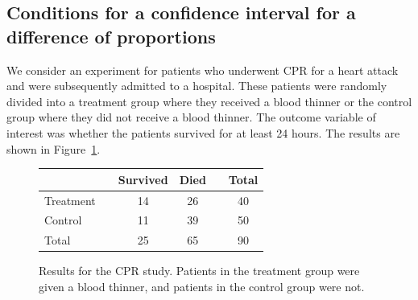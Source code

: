 \D{\newpage}

\subsection{Conditions for a confidence interval for a difference of proportions}

We consider an experiment for patients who underwent CPR for a heart attack and were subsequently admitted to a hospital. These patients were randomly divided into a treatment group where they received a blood thinner or the control group where they did not receive a blood thinner. The outcome variable of interest was whether the patients survived for at least 24 hours.
    The results are shown in  Figure~\ref{resultsForCPRStudyInSmallSampleSection}.

\begin{figure}[ht]
\centering
\begin{tabular}{lccccc}
\hline
			&& Survived 	& Died 	&& Total \\
\hline
Treatment		&& 14		& 26		&& 40 \\
Control		&& 11		& 39		&& 50 \\

\hline
Total			&& 25		& 65		&& 90 \\
\hline
\end{tabular}
\caption{Results for the CPR study.
    Patients in the treatment group were given
    a blood thinner, and patients in the control
    group were not.}
\label{resultsForCPRStudyInSmallSampleSection}
\end{figure}


